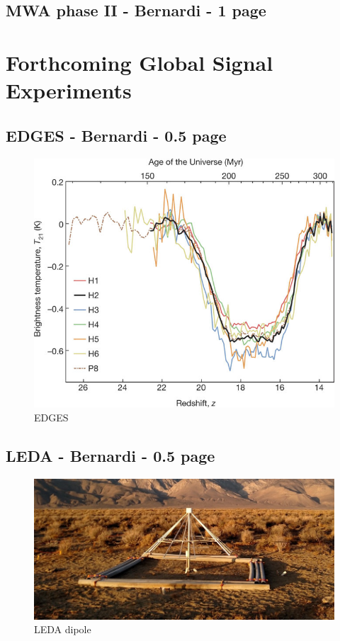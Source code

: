 \subsection{MWA phase II - Bernardi - 1 page}





\section{Forthcoming Global Signal Experiments}

\subsection{EDGES - Bernardi - 0.5 page}
\begin{figure}[]
\begin{center}
\includegraphics[width=1.\textwidth]{Koopmans_Bernardi/edges_trough}
\end{center}
\caption{EDGES}
\label{fig:fig_edges}
\end{figure}

\subsection{LEDA - Bernardi - 0.5 page}
\begin{figure}[]
\begin{center}
\includegraphics[width=1.\textwidth]{Koopmans_Bernardi/leda_dipole}
\end{center}
\caption{LEDA dipole}
\label{fig:fig_leda_dipole}
\end{figure}




